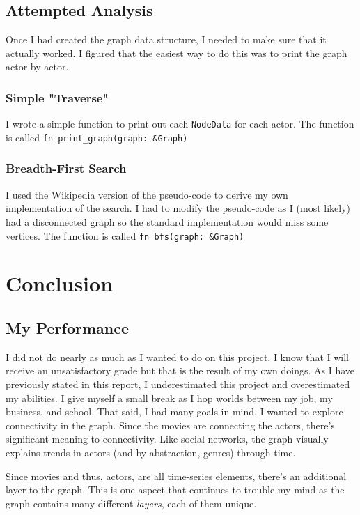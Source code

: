 \documentclass[12pt,letterpaper]{article}
\begin{document}
\subsection{Attempted Analysis}

Once I had created the graph data structure, I needed to make sure that it actually worked.  I figured that the easiest way to do this was to print the graph actor by actor. 

\subsubsection{Simple "Traverse"}

I wrote a simple function to print out each \texttt{NodeData} for each actor.  The function is called \texttt{fn print\_graph(graph: \&Graph)}

\subsubsection{Breadth-First Search}

I used the Wikipedia version of the pseudo-code to derive my own implementation of the search. I had to modify the pseudo-code as I (most likely) had a disconnected graph so the standard implementation would miss some vertices.  The function is called \texttt{fn bfs(graph: \&Graph)}

\section{Conclusion}

\subsection{My Performance}

I did not do nearly as much as I wanted to do on this project.  I know that I will receive an unsatisfactory grade but that is the result of my own doings.  As I have previously stated in this report,  I underestimated this project and overestimated my abilities.  I give myself a small break as I hop worlds between my job, my business, and school.  That said, I had many goals in mind. I wanted to explore connectivity in the graph. Since the movies are connecting the actors, there's significant meaning to connectivity. Like social networks,  the graph visually explains trends in actors (and by abstraction, genres) through time. 

Since movies and thus, actors, are all time-series elements, there's an additional layer to the graph.  This is one aspect that continues to trouble my mind as the graph contains many different \textit{layers}, each of them unique.  
\end{document}
